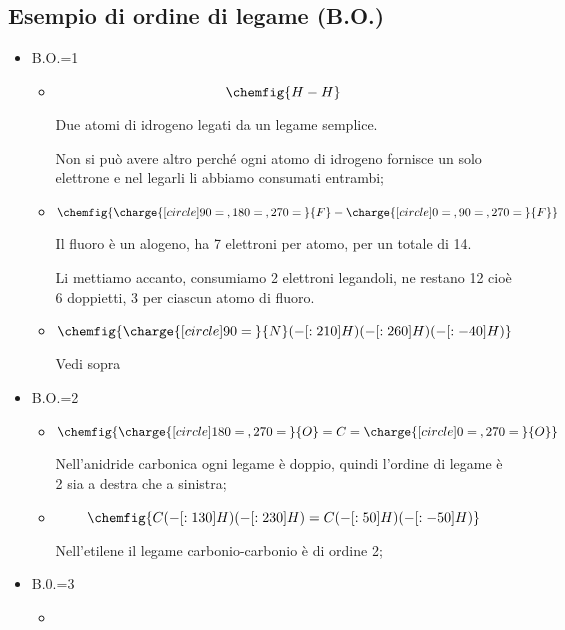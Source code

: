 \subsection{Esempio di ordine di legame (B.O.)}
\begin{itemize}
    \item B.O.=1
    \begin{itemize}
        \item {}
        
        $$
        \chemfig{H-H}
        $$

        Due atomi di idrogeno legati da un legame semplice.
        
        Non si può avere altro perché ogni atomo di idrogeno fornisce un solo elettrone e nel legarli li abbiamo consumati entrambi;
        \item {}
        
        $$
        \chemfig{\charge{[circle]90=\:,180=\:,270=\:}{F}-\charge{[circle]0=\:,90=\:,270=\:}{F}}
        $$

        Il fluoro è un alogeno, ha 7 elettroni per atomo, per un totale di 14.
        
        Li mettiamo accanto, consumiamo 2 elettroni legandoli, ne restano 12 cioè 6 doppietti, 3 per ciascun atomo di fluoro.
        \item {}
        
        $$
        \chemfig{\charge{[circle]90=\:}{N}(-[:210]H)(-[:260]H)(-[:-40]H)}
        $$

        Vedi sopra
    \end{itemize}
    \item B.O.=2
    \begin{itemize}
        \item {}
        
        $$
        \chemfig{\charge{[circle]180=\:,270=\:}{O}=C=\charge{[circle]0=\:,270=\:}{O}}
        $$

        Nell'anidride carbonica ogni legame è doppio, quindi l'ordine di legame è 2 sia a destra che a sinistra;
        \item {}
        
        $$
        \chemfig{C(-[:130]H)(-[:230]H)=C(-[:50]H)(-[:-50]H)}
        $$

        Nell'etilene il legame carbonio-carbonio è di ordine 2;
    \end{itemize}
    \item B.0.=3
    \begin{itemize}
        \item {}
        

\end{itemize}
\end{itemize}
